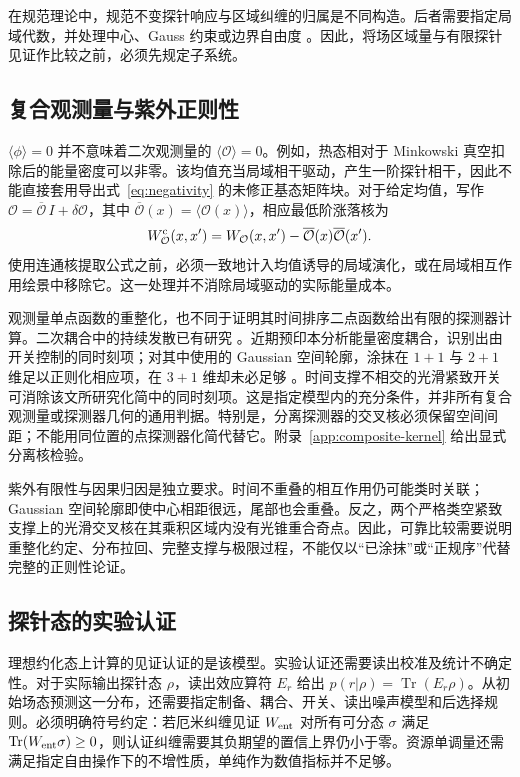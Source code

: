 \documentclass[UTF8,11pt,a4paper,fontset=none]{ctexart}
\newcommand{\Tr}{\operatorname{Tr}}
\begin{document}
在规范理论中，规范不变探针响应与区域纠缠的归属是不同构造。后者需要指定局域代数，并处理中心、Gauss 约束或边界自由度 \cite{CasiniHuertaRosabal2014,DonnellyFreidel2016}。因此，将场区域量与有限探针见证作比较之前，必须先规定子系统。

\subsection{复合观测量与紫外正则性}
$\langle\phi\rangle=0$ 并不意味着二次观测量的 $\langle\mathcal O\rangle=0$。例如，热态相对于 Minkowski 真空扣除后的能量密度可以非零。该均值充当局域相干驱动，产生一阶探针相干，因此不能直接套用导出式~\eqref{eq:negativity} 的未修正基态矩阵块。对于给定均值，写作 $\mathcal O=\overline{\mathcal O}\,I+\delta\mathcal O$，其中 $\overline{\mathcal O}(x)=\langle\mathcal O(x)\rangle$，相应最低阶涨落核为
\begin{equation}
W_{\mathcal O}^{\rm c}(x,x')=
W_{\mathcal O}(x,x')-\overline{\mathcal O}(x)\overline{\mathcal O}(x').
\label{eq:connected-composite-kernel}
\end{equation}
使用连通核提取公式之前，必须一致地计入均值诱导的局域演化，或在局域相互作用绘景中移除它。这一处理并不消除局域驱动的实际能量成本。

观测量单点函数的重整化，也不同于证明其时间排序二点函数给出有限的探测器计算。二次耦合中的持续发散已有研究 \cite{SachsMannMartinez2017}。近期预印本分析能量密度耦合，识别出由开关控制的同时刻项；对其中使用的 Gaussian 空间轮廓，涂抹在 $1+1$ 与 $2+1$ 维足以正则化相应项，在 $3+1$ 维却未必足够 \cite{ZambiancoRagulaMartinez2026UV}。时间支撑不相交的光滑紧致开关可消除该文所研究化简中的同时刻项。这是指定模型内的充分条件，并非所有复合观测量或探测器几何的通用判据。特别是，分离探测器的交叉核必须保留空间间距；不能用同位置的点探测器化简代替它。附录~\ref{app:composite-kernel} 给出显式分离核检验。

紫外有限性与因果归因是独立要求。时间不重叠的相互作用仍可能类时关联；Gaussian 空间轮廓即使中心相距很远，尾部也会重叠。反之，两个严格类空紧致支撑上的光滑交叉核在其乘积区域内没有光锥重合奇点。因此，可靠比较需要说明重整化约定、分布拉回、完整支撑与极限过程，不能仅以“已涂抹”或“正规序”代替完整的正则性论证。

\subsection{探针态的实验认证}
\label{sec:reliability}
理想约化态上计算的见证认证的是该模型。实验认证还需要读出校准及统计不确定性。对于实际输出探针态 $\rho$，读出效应算符 $E_r$ 给出 $p(r|\rho)=\Tr(E_r\rho)$。从初始场态预测这一分布，还需要指定制备、耦合、开关、读出噪声模型和后选择规则。必须明确符号约定：若厄米纠缠见证 $W_{\rm ent}$ 对所有可分态 $\sigma$ 满足 $\Tr(W_{\rm ent}\sigma)\geq0$，则认证纠缠需要其负期望的置信上界仍小于零。资源单调量还需满足指定自由操作下的不增性质，单纯作为数值指标并不足够。
\end{document}
